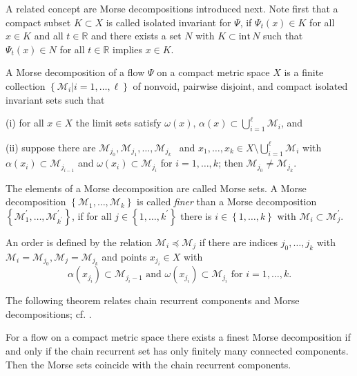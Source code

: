 \documentclass{siamltex}%
\begin{document}
A related concept are Morse decompositions introduced next. Note first that a
compact subset $K\subset X$ is called isolated invariant for $\Psi$, if
$\Psi_{t}(x)\in K$ for all $x\in K$ and all $t\in\mathbb{R}$ and there exists
a set $N$ with $K\subset\mathrm{int}\,N$ such that $\Psi_{t}(x)\in N$ for all
$t\in\mathbb{R}$ implies $x\in K$.

\begin{definition}
\label{defMorsedecomp}A Morse decomposition of a flow $\Psi$ on a compact
metric space $X$ is a finite collection $\left\{  \mathcal{M}_{i}\left\vert
i=1,\ldots,\ell\right.  \right\}  $ of nonvoid, pairwise disjoint, and compact
isolated invariant sets such that

(i) for all $x\in X$ the limit sets satisfy $\omega(x),\,\alpha(x)\subset
\bigcup_{i=1}^{\ell}\mathcal{M}_{i}$, and

(ii) suppose there are $\mathcal{M}_{j_{0}},\mathcal{M}_{j_{1}},\ldots
,\mathcal{M}_{j_{k}\text{ }}$ and $x_{1},\ldots,x_{k}\in X\setminus
\bigcup_{i=1}^{\ell}\mathcal{M}_{i}$ with $\alpha(x_{i})\subset\mathcal{M}%
_{j_{i-1}}$ and $\omega(x_{i})\subset\mathcal{M}_{j_{i}}$ for $i=1,\ldots,k$;
then $\mathcal{M}_{j_{0}}\neq\mathcal{M}_{j_{k}}$.

The elements of a Morse decomposition are called Morse sets. A Morse
decomposition $\left\{  \mathcal{M}_{1},\ldots,\mathcal{M}_{k}\right\}  $ is
called \textit{finer} than a Morse decomposition $\left\{  \mathcal{M}%
_{1}^{\prime},\ldots,\mathcal{M}_{k^{\prime}}^{\prime}\right\}  $, if for all
$j\in\left\{  1,\ldots,k^{\prime}\right\}  $ there is $i\in\left\{
1,\ldots,k\right\}  $ with $\mathcal{M}_{i}\subset\mathcal{M}_{j}^{\prime}$.
\end{definition}

An order is defined by the relation $\mathcal{M}_{i}\preceq\mathcal{M}_{j}$ if
there are indices $j_{0},\ldots,j_{k}$ with $\mathcal{M}_{i}=\mathcal{M}%
_{j_{0}},\mathcal{M}_{j}=\mathcal{M}_{j_{k}}$ and points $x_{j_{i}}\in X$
with
\[
\alpha(x_{j_{i}})\subset\mathcal{M}_{j_{i}-1}\mbox{ and }\omega(x_{j_{i}%
})\subset\mathcal{M}_{j_{i}}\mbox{ for }i=1,\ldots,k.
\]


The following theorem relates chain recurrent components and Morse
decompositions; cf. \cite[Theorem 8.3.3]{ColK14}.

\begin{theorem}
For a flow on a compact metric space there exists a finest Morse decomposition
if and only if the chain recurrent set has only finitely many connected
components. Then the Morse sets coincide with the chain recurrent components.
\end{theorem}
\end{document}
